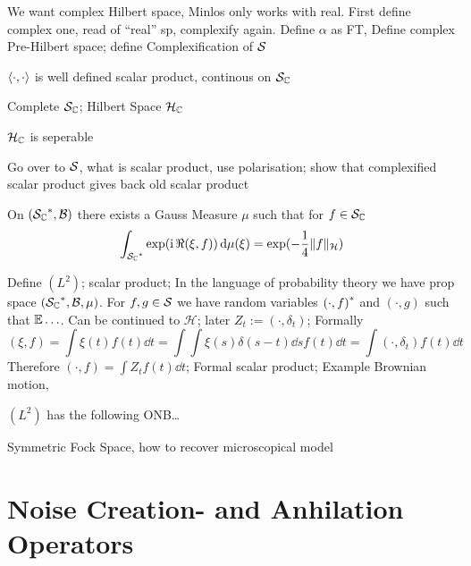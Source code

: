 We want complex Hilbert space, Minlos only works with real. First define complex one, read of ``real'' sp, complexify again. Define $\alpha$ as FT, Define complex Pre-Hilbert space; define Complexification of $\SchwartzS$
\begin{lem}
  $\sp{\cdot}{\cdot}$ is well defined scalar product, continous on $\SchwartzS_\Complex$
\end{lem}
Complete $\SchwartzS_\Complex$; Hilbert Space $\mathcal{H}_\Complex$
\begin{lem}
  $\mathcal{H}_\Complex$ is seperable
\end{lem}

Go over to $\SchwartzS$, what is scalar product, use polarisation; show that complexified scalar product gives back old scalar product
\begin{thm} \label{thm:mp_existence}
  On $(\dual{\mathcal{S}_\Complex}, \mathcal{B})$ there exists a Gauss Measure $\mu$ such that for $f \in \SchwartzS_\Complex$
  \begin{equation}
    \label{eq:mp_fourier_gauss}
    \int_{\dual{\SchwartzS_\Complex}} \exp{\left(\ii \, \Re(\xi, f)\right)} \dd\mu(\xi) = \exp(-\frac{1}{4} \Vert f \Vert_\mathcal{H})
  \end{equation}
\end{thm}

Define $(L^2)$; scalar product; In the language of probability theory we have prop space $(\dual{\SchwartzS_\Complex}, \mathcal{B}, \mu)$. For $f,g \in \SchwartzS$ we have random variables $\cc{(\cdot, f)}$ and $(\cdot, g)$ such that $\E \ldots$. Can be continued to $\mathcal{H}$; later $Z_t := (\cdot, \delta_t)$; Formally
  \begin{equation*}
  (\xi, f) = \int \xi(t) f(t) \dd t = \int \int \xi(s) \delta(s-t) \dd s f(t) \dd t = \int (\cdot, \delta_t) f(t) \dd t
  \end{equation*}
Therefore $(\cdot, f) = \int Z_t f(t) \dd t$; Formal scalar product; Example Brownian motion,

  \begin{thm} \label{thm:mp_expansion}
  $(L^2)$ has the following ONB\dots
  \end{thm}
Symmetric Fock Space, how to recover microscopical model


\section{Noise Creation- and Anhilation Operators}
\label{sec:math.operators}

